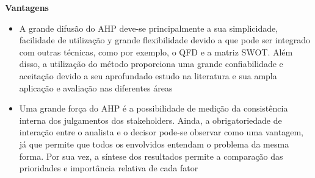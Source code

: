 \documentclass[12pt]{article}[abntex2]
\begin{document}
\begin{center}
\textbf{\Large{Vantagens}}\\
\end{center}
\begin{multicols}{2}
        \begin{itemize} 
\item A grande difusão do AHP deve-se
        principalmente a sua simplicidade,
        facilidade de utilização y grande
        flexibilidade devido a que pode ser
        integrado com outras técnicas, como por
        exemplo, o QFD e a matriz SWOT. Além
        disso, a utilização do método proporciona
        uma grande confiabilidade e aceitação
        devido a seu aprofundado estudo na
        literatura e sua ampla aplicação e
        avaliação nas diferentes áreas \cite{RODRÍGUEZ2008toma,norris1995ius}
        \item Uma grande força do AHP é a
        possibilidade de medição da consistência
        interna dos julgamentos dos stakeholders.
        Ainda, a obrigatoriedade de interação entre
        o analista e o decisor pode-se observar
        como uma vantagem, já que permite que
        todos os envolvidos entendam o problema
        da mesma forma. Por sua vez, a síntese
        dos resultados permite a comparação das
        prioridades e importância relativa de cada
        fator \cite{VilasAnalise,liberatore1997group,salomon1999justificativas,boucher1997comparison,wang2008fuzzy,norris1995ius}
        \end{itemize} 
        \end{multicols}
\end{document}
